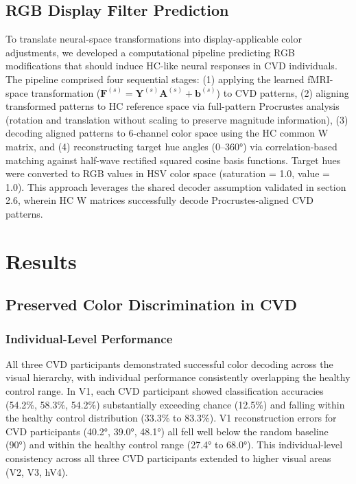 \documentclass[12pt,a4paper]{article}
\begin{document}
\subsection{RGB Display Filter Prediction}

To translate neural-space transformations into display-applicable color adjustments, we developed a computational pipeline predicting RGB modifications that should induce HC-like neural responses in CVD individuals. The pipeline comprised four sequential stages: (1) applying the learned fMRI-space transformation ($\mathbf{F}^{(s)} = \mathbf{Y}^{(s)} \mathbf{A}^{(s)} + \mathbf{b}^{(s)}$) to CVD patterns, (2) aligning transformed patterns to HC reference space via full-pattern Procrustes analysis (rotation and translation without scaling to preserve magnitude information), (3) decoding aligned patterns to 6-channel color space using the HC common W matrix, and (4) reconstructing target hue angles (0--360°) via correlation-based matching against half-wave rectified squared cosine basis functions. Target hues were converted to RGB values in HSV color space (saturation = 1.0, value = 1.0). This approach leverages the shared decoder assumption validated in section 2.6, wherein HC W matrices successfully decode Procrustes-aligned CVD patterns.

\section{Results}

\subsection{Preserved Color Discrimination in CVD}

\subsubsection{Individual-Level Performance}

All three CVD participants demonstrated successful color decoding across the visual hierarchy, with individual performance consistently overlapping the healthy control range. In V1, each CVD participant showed classification accuracies (54.2\%, 58.3\%, 54.2\%) substantially exceeding chance (12.5\%) and falling within the healthy control distribution (33.3\% to 83.3\%). V1 reconstruction errors for CVD participants (40.2°, 39.0°, 48.1°) all fell well below the random baseline (90°) and within the healthy control range (27.4° to 68.0°). This individual-level consistency across all three CVD participants extended to higher visual areas (V2, V3, hV4).
\end{document}
